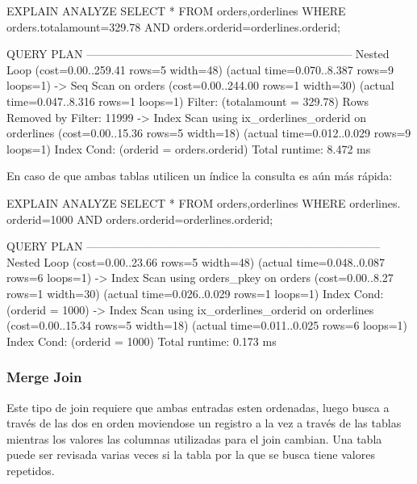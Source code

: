 \begin{pyglist}
EXPLAIN ANALYZE SELECT * FROM orders,orderlines WHERE 
orders.totalamount=329.78 AND orders.orderid=orderlines.orderid;

QUERY PLAN                                                                
-----------------------------------------------------------------------
 Nested Loop  (cost=0.00..259.41 rows=5 width=48) 
              (actual time=0.070..8.387 rows=9 loops=1)
   ->  Seq Scan on orders  (cost=0.00..244.00 rows=1 width=30) 
                      (actual time=0.047..8.316 rows=1 loops=1)
         Filter: (totalamount = 329.78)
         Rows Removed by Filter: 11999
   ->  Index Scan using ix_orderlines_orderid on orderlines  
     (cost=0.00..15.36 rows=5 width=18) 
                  (actual time=0.012..0.029 rows=9 loops=1)
         Index Cond: (orderid = orders.orderid)
 Total runtime: 8.472 ms
\end{pyglist}

En caso de que ambas tablas utilicen un índice la consulta es aún más rápida:\\

\begin{pyglist}
EXPLAIN ANALYZE SELECT * FROM orders,orderlines WHERE orderlines.
orderid=1000 AND orders.orderid=orderlines.orderid;

 QUERY PLAN                                                                
------------------------------------------------------------------------------
 Nested Loop  (cost=0.00..23.66 rows=5 width=48) 
              (actual time=0.048..0.087 rows=6 loops=1)
   ->  Index Scan using orders_pkey on orders  (cost=0.00..8.27 rows=1 width=30) 
                                       (actual time=0.026..0.029 rows=1 loops=1)
         Index Cond: (orderid = 1000)
   ->  Index Scan using ix_orderlines_orderid on orderlines  
                                               (cost=0.00..15.34 rows=5 width=18)
                                       (actual time=0.011..0.025 rows=6 loops=1)
         Index Cond: (orderid = 1000)
 Total runtime: 0.173 ms
\end{pyglist}


\subsubsection{Merge Join}

Este tipo de join requiere que ambas entradas esten ordenadas, luego busca a través de las dos en orden moviendose un registro a la vez a través de las tablas mientras los valores las columnas utilizadas para el join cambian. Una tabla puede ser revisada varias veces si la tabla por la que se busca tiene valores repetidos.\\

